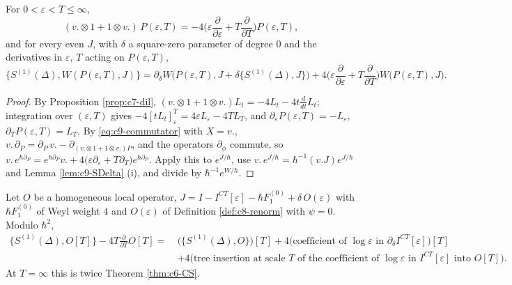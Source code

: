 \begin{proposition}
\label{prop:c9-ward}
For $0<\varepsilon<T\le\infty$,
\begin{equation}
(v.\otimes1+1\otimes v.)\,P(\varepsilon,T)=-4\Big(\varepsilon\frac{\partial}{\partial\varepsilon}+T\frac{\partial}{\partial T}\Big)P(\varepsilon,T),
\label{eq:c9-MP}
\end{equation}
and for every even $J$, with $\delta$ a square-zero parameter of degree $0$ and the derivatives in $\varepsilon$, $T$ acting on $P(\varepsilon,T)$,
\begin{equation}
\{S^{(1)}(\Delta),W(P(\varepsilon,T),J)\}=\partial_\delta W\big(P(\varepsilon,T),J+\delta\{S^{(1)}(\Delta),J\}\big)+4\Big(\varepsilon\frac{\partial}{\partial\varepsilon}+T\frac{\partial}{\partial T}\Big)W\big(P(\varepsilon,T),J\big).
\label{eq:c9-ward}
\end{equation}
\end{proposition}

\begin{proof}
By Proposition \ref{prop:c7-dil}, $(v.\otimes1+1\otimes v.)L_t=-4L_t-4t\frac{d}{dt}L_t$; integration over $(\varepsilon,T)$ gives $-4[tL_t]_\varepsilon^T=4\varepsilon L_\varepsilon-4TL_T$, and $\partial_\varepsilon P(\varepsilon,T)=-L_\varepsilon$, $\partial_TP(\varepsilon,T)=L_T$. By \eqref{eq:c9-commutator} with $X=v.$, $v.\,\partial_P=\partial_P\,v.-\partial_{(v.\otimes1+1\otimes v.)P}$, and the operators $\partial_\phi$ commute, so $v.\,e^{\hbar\partial_P}=e^{\hbar\partial_P}v.+4\big(\varepsilon\partial_\varepsilon+T\partial_T\big)e^{\hbar\partial_P}$. Apply this to $e^{J/\hbar}$, use $v.\,e^{J/\hbar}=\hbar^{-1}(v.J)e^{J/\hbar}$ and Lemma \ref{lem:c9-SDelta} (i), and divide by $\hbar^{-1}e^{W/\hbar}$.
\end{proof}

\begin{corollary}
\label{cor:c9-CS}
Let $O$ be a homogeneous local operator, $J=I-I^{CT}[\varepsilon]-\hbar F_1^{(0)}+\delta\,O(\varepsilon)$ with $\hbar F_1^{(0)}$ of Weyl weight $4$ and $O(\varepsilon)$ of Definition \ref{def:c8-renorm} with $\psi=0$. Modulo $\hbar^2$,
\[
\begin{aligned}
\{S^{(1)}(\Delta),O[T]\}-4T\frac{\partial}{\partial T}O[T]=\ &\big(\{S^{(1)}(\Delta),O\}\big)[T]+4\big(\text{coefficient of }\log\varepsilon\text{ in }\partial_\delta I^{CT}[\varepsilon]\big)[T]\\
&+4\big(\text{tree insertion at scale }T\text{ of the coefficient of }\log\varepsilon\text{ in }I^{CT}[\varepsilon]\text{ into }O[T]\big).
\end{aligned}
\]
At $T=\infty$ this is twice Theorem \ref{thm:c6-CS}.
\end{corollary}

